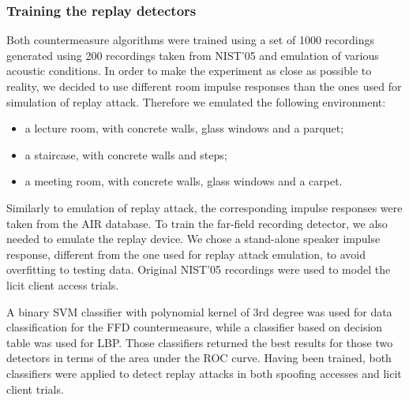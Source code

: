 \subsubsection{Training the replay detectors} Both countermeasure algorithms were trained using a set of 1000 recordings generated using 200 recordings taken from NIST'05 and emulation of various acoustic conditions. In order to make the experiment as close as possible to reality, we decided to use different room impulse responses than the ones used for simulation of replay attack. Therefore we emulated the following environment:
\begin{itemize}
\item a lecture room, with concrete walls, glass windows and a parquet;
\item a staircase, with concrete walls and steps;
\item a meeting room, with concrete walls, glass windows and a carpet.
\end{itemize}

Similarly to emulation of replay attack, the corresponding impulse responses were taken from the AIR database. To train the far-field recording detector, we also needed to emulate the replay device. We chose a stand-alone speaker impulse response, different from the one used for replay attack emulation, to avoid overfitting to testing data. Original NIST'05 recordings were used to model the licit client access trials.

A binary SVM classifier with polynomial kernel of 3rd degree was used for data classification for the FFD countermeasure, while a classifier based on decision table was used for LBP. Those classifiers returned the best results for those two detectors in terms of the area under the ROC curve. Having been trained, both classifiers were applied to detect replay attacks in both spoofing accesses and licit client trials.
